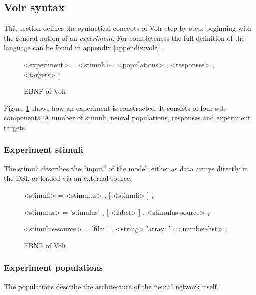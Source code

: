 \subsection{Volr syntax}
This section defines the syntactical concepts of Volr step by step, beginning
with the general notion of an \textit{experiment}. For completeness the full
definition of the language can be found in appendix \ref{appendix:volr}.

\begin{figure}
  \label{fig:volr-ebnf}
  \begin{minipage}{0.9\linewidth}
    \begin{grammar}
      <experiment> = <stimuli> , <populations> , <responses> , <targets> ;
    \end{grammar}
  \end{minipage}
  \caption{EBNF of Volr}
\end{figure}

Figure \ref{fig:volr-ebnf} shows how an experiment is constructed. It consists
of four sub-components: A number of stimuli, neural populations, responses and
experiment targets.

\subsubsection{Experiment stimuli}
The stimuli describes the ``input'' of the model, either as data arrays directly
in the DSL or loaded via an external source.

\begin{figure}
  \label{fig:volr-ebnf-stimuli}
  \begin{minipage}{0.9\linewidth}
    \begin{grammar}
      <stimuli>  = <stimulus> , [ <stimuli> ] ;

      <stimulus> = 'stimulus' , [ <label> ] , <stimulus-source> ;

      <stimulus-source> = 'file: ' , <string>
        \alt 'array: ' , <number-list> ;
    \end{grammar}
  \end{minipage}
  \caption{EBNF of Volr}
\end{figure}


\subsubsection{Experiment populations}
The populations describe the architecture of the neural network itself,

